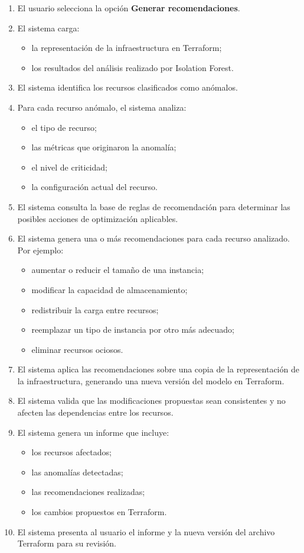 \begin{enumerate}
\item El usuario selecciona la opción \textbf{Generar recomendaciones}.
\item El sistema carga:
  \begin{itemize}
  \item la representación de la infraestructura en Terraform;
  \item los resultados del análisis realizado por Isolation Forest.
  \end{itemize}
\item El sistema identifica los recursos clasificados como anómalos.
\item Para cada recurso anómalo, el sistema analiza:
  \begin{itemize}
  \item el tipo de recurso;
  \item las métricas que originaron la anomalía;
  \item el nivel de criticidad;
  \item la configuración actual del recurso.
  \end{itemize}
\item El sistema consulta la base de reglas de recomendación para determinar las posibles acciones de optimización aplicables.
\item El sistema genera una o más recomendaciones para cada recurso analizado. Por ejemplo:
  \begin{itemize}
  \item aumentar o reducir el tamaño de una instancia;
  \item modificar la capacidad de almacenamiento;
  \item redistribuir la carga entre recursos;
  \item reemplazar un tipo de instancia por otro más adecuado;
  \item eliminar recursos ociosos.
  \end{itemize}
\item El sistema aplica las recomendaciones sobre una copia de la representación de la infraestructura, generando una nueva versión del modelo en Terraform.
\item El sistema valida que las modificaciones propuestas sean consistentes y no afecten las dependencias entre los recursos.
\item El sistema genera un informe que incluye:
  \begin{itemize}
  \item los recursos afectados;
  \item las anomalías detectadas;
  \item las recomendaciones realizadas;
  \item los cambios propuestos en Terraform.
  \end{itemize}
\item El sistema presenta al usuario el informe y la nueva versión del archivo Terraform para su revisión.
\end{enumerate}

